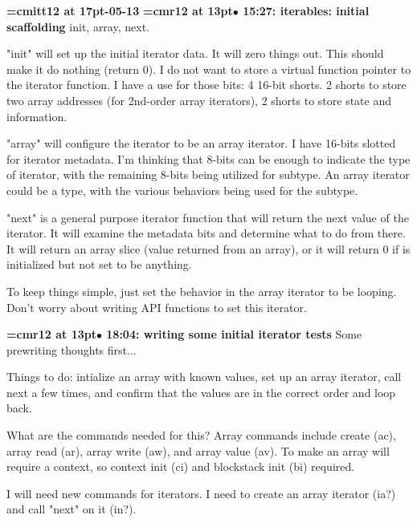 {\medskip\noindent\bf\font\titlefont=cmitt12 at 17pt-05-13}\medskip
{\smallskip\noindent\bf\font\titlefont=cmr12 at 13pt\titlefont $\bullet$ 15:27: iterables: initial scaffolding}\smallskip
init, array, next.
\par

"init" will set up the initial iterator data. It will zero things out. This should make it do nothing (return 0). I do not want to store a virtual function pointer to the iterator function. I have a use for those bits: 4 16-bit shorts. 2 shorts to store two array addresses (for 2nd-order array iterators), 2 shorts to store state and information.
\par

"array" will configure the iterator to be an array iterator. I have 16-bits slotted for iterator metadata. I'm thinking that 8-bits can be enough to indicate the type of iterator, with the remaining 8-bits being utilized for subtype. An array iterator could be a type, with the various behaviors being used for the subtype.
\par

"next" is a general purpose iterator function that will return the next value of the iterator. It will examine the metadata bits and determine what to do from there. It will return an array slice (value returned from an array), or it will return 0 if is initialized but not set to be anything.
\par

To keep things simple, just set the behavior in the array iterator to be looping. Don't worry about writing API functions to set this iterator.
\par

{\smallskip\noindent\bf\font\titlefont=cmr12 at 13pt\titlefont $\bullet$ 18:04: writing some initial iterator tests}\smallskip
Some prewriting thoughts first...
\par

Things to do: intialize an array with known values, set up an array iterator, call next a few times, and confirm that the values are in the correct order and loop back.
\par

What are the commands needed for this? Array commands include create (ac), array read (ar), array write (aw), and array value (av). To make an array will require a context, so context init (ci) and blockstack init (bi) required.
\par

I will need new commands for iterators. I need to create an array iterator (ia?) and call "next" on it (in?).
\par

